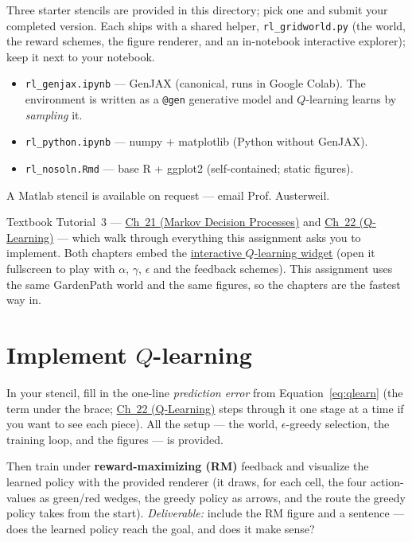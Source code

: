 \documentclass[11pt]{article}
\newcommand{\chmdp}{\href{https://josephausterweil.github.io/probintro/intro2/21_markov_decision_processes/}{Ch~21 (Markov Decision Processes)}}
\newcommand{\chql}{\href{https://josephausterweil.github.io/probintro/intro2/22_q_learning/}{Ch~22 (Q-Learning)}}
\newcommand{\qlwidget}{\href{https://josephausterweil.github.io/probintro/widgets/qlearning-gridworld.html}{interactive $Q$-learning widget}}
\begin{document}
\vspace{1em}
 Three starter stencils are provided in this directory;
pick one and submit your completed version. Each ships with a shared helper,
\texttt{rl\_gridworld.py} (the world, the reward schemes, the figure renderer, and
an in-notebook interactive explorer); keep it next to your notebook.
\begin{itemize}
    \item \texttt{rl\_genjax.ipynb} --- GenJAX (canonical, runs in Google Colab). The environment is written as a \texttt{@gen} generative model and $Q$-learning learns by {\em sampling} it.
    \item \texttt{rl\_python.ipynb} --- numpy + matplotlib (Python without GenJAX).
    \item \texttt{rl\_nosoln.Rmd} --- base R + ggplot2 (self-contained; static figures).
\end{itemize}
A Matlab stencil is available on request --- email Prof. Austerweil.

\vspace{0.5em}
 Textbook Tutorial~3 --- \chmdp{} and \chql{} --- which
walk through everything this assignment asks you to implement. Both chapters embed
the \qlwidget{} (open it fullscreen to play with $\alpha$, $\gamma$, $\epsilon$ and
the feedback schemes). This assignment uses the same GardenPath world and the same
figures, so the chapters are the fastest way in.

\section{Implement $Q$-learning}
In your stencil, fill in the one-line {\em prediction error} from
Equation~\eqref{eq:qlearn} (the term under the brace; \chql{} steps through it one
stage at a time if you want to see each piece). All the setup --- the world,
$\epsilon$-greedy selection, the training loop, and the figures --- is provided.

Then train under {\bf reward-maximizing (RM)} feedback and visualize the learned
policy with the provided renderer (it draws, for each cell, the four action-values
as green/red wedges, the greedy policy as arrows, and the route the greedy policy
takes from the start). {\em Deliverable:} include the RM figure and a sentence ---
does the learned policy reach the goal, and does it make sense?
\end{document}
